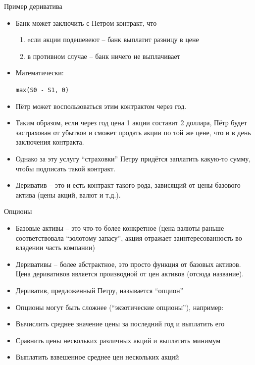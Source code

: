 \documentclass{beamer}
\begin{document}
\begin{frame}{Пример дериватива}
\begin{itemize}
\item
  Банк может заключить с Петром контракт, что

  \begin{enumerate}[1.]
  \item
    eсли акции подешевеют -- банк выплатит разницу в цене
  \item
    в противном случае -- банк ничего не выплачивает
  \end{enumerate}
\item
  Математически:

  \texttt{max(S0 - S1, 0)}
\item
  Пётр может воспользоваться этим контрактом через год.
\item
  Таким образом, если через год цена 1 акции составит 2 доллара, Пётр
  будет застрахован от убытков и сможет продать акции по той же цене,
  что и в день заключения контракта.
\item
  Однако за эту услугу ``страховки'' Петру придётся заплатить какую-то
  сумму, чтобы подписать такой контракт.
\item
  Дериватив -- это и есть контракт такого рода, зависящий от цены
  базового актива (цены акций, валют и т.д.).
\end{itemize}
\end{frame}\begin{frame}{Опционы}

\begin{itemize}
\item
  Базовые активы -- это что-то более конкретное (цена валюты раньше
  соответствовала ``золотому запасу'', акция отражает заинтересованность
  во владении часть компании)
\item
  Деривативы -- более абстрактное, это просто функция от базовых активов.
  Цена деривативов является производной от цен активов (отсюда
  название).
\item
  Дериватив, предложенный Петру, называется ``опцион''
\item
  Опционы могут быть сложнее (``экзотические опционы''), например:
\item
  Вычислить среднее значение цены за последний год и выплатить его
\item
  Сравнить цены нескольких различных акций и выплатить минимум
\item
  Выплатить взвешенное среднее цен нескольких акций
\end{itemize}
\end{frame}
\end{document}
